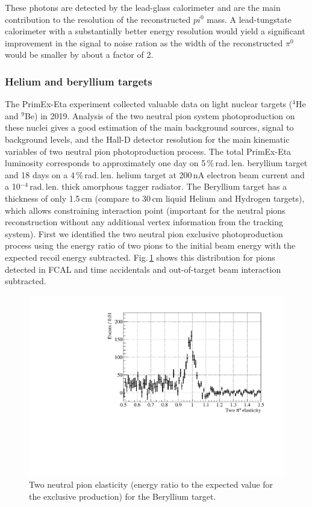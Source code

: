 These photons are detected by the lead-glass calorimeter and are the
main contribution to the resolution of the reconstructed $pi^{0}$
mass. A lead-tungstate calorimeter with a substantially better energy
resolution would yield a significant improvement in the signal to
noise ration as the width of the reconstructed $\pi^{0}$ would be
smaller by about a factor of 2.
\subsubsection{Helium and beryllium targets}
The PrimEx-Eta experiment collected valuable data on light nuclear targets ($^4$He and $^9$Be) in 2019. Analysis of the two neutral pion system photoproduction on these nuclei gives a good estimation of the main background sources, signal to background levels, and the Hall-D detector resolution for the main kinematic variables of two neutral pion photoproduction process. The total PrimEx-Eta luminosity corresponds to approximately one day on 5$\,$\%$\,$rad.$\,$len. beryllium target and 18 days on a 4$\,$\%$\,$rad.$\,$len. helium target at 200$\,$nA electron beam current and a 10$^{-4}\,$rad.$\,$len. thick amorphous tagger radiator. The Beryllium target has a thickness of only 1.5$\,$cm (compare to 30$\,$cm liquid Helium and Hydrogen targets), which allows constraining interaction point (important for the neutral pions reconstruction without any additional vertex information from the tracking system).
First we identified the two neutral pion exclusive photoproduction process using the energy ratio of two pions to the initial beam energy with the expected recoil energy subtracted. Fig.$\,$\ref{fig:pi0elastbe} shows this distribution for pions detected in FCAL and time accidentals and out-of-target beam interaction subtracted.
\begin{figure}[!h]
\centering\includegraphics[width=4.75in]{figures/be_elast1.pdf}
\caption{Two neutral pion elasticity (energy ratio to the expected value for the exclusive production) for the Beryllium target.
\label{fig:pi0elastbe}}
\end{figure}
